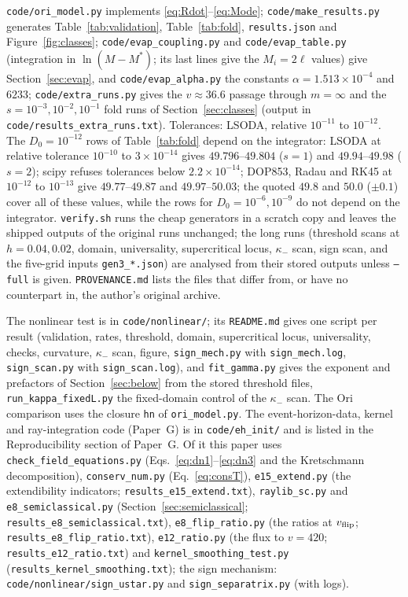 \documentclass[11pt]{article}
\begin{document}
\texttt{code/ori\_model.py} implements \eqref{eq:Rdot}--\eqref{eq:Mode}; \texttt{code/make\_results.py} generates Table~\ref{tab:validation}, Table~\ref{tab:fold}, \texttt{results.json} and Figure~\ref{fig:classes}; \texttt{code/evap\_coupling.py} and \texttt{code/evap\_table.py} (integration in $\ln(M-M^*)$; its last lines give the $M_i=2\ell$ values) give Section~\ref{sec:evap}, and \texttt{code/evap\_alpha.py} the constants $\alpha=1.513\times10^{-4}$ and $6233$; \texttt{code/extra\_runs.py} gives the $v\approx36.6$ passage through $m=\infty$ and the $s=10^{-3},10^{-2},10^{-1}$ fold runs of Section~\ref{sec:classes} (output in \texttt{code/results\_extra\_runs.txt}). Tolerances: LSODA, relative $10^{-11}$ to $10^{-12}$. The $D_0=10^{-12}$ rows of Table~\ref{tab:fold} depend on the integrator: LSODA at relative tolerance $10^{-10}$ to $3\times10^{-14}$ gives $49.796$--$49.804$ ($s=1$) and $49.94$--$49.98$ ($s=2$); scipy refuses tolerances below $2.2\times10^{-14}$; DOP853, Radau and RK45 at $10^{-12}$ to $10^{-13}$ give $49.77$--$49.87$ and $49.97$--$50.03$; the quoted $49.8$ and $50.0$ ($\pm0.1$) cover all of these values, while the rows for $D_0=10^{-6},10^{-9}$ do not depend on the integrator. \texttt{verify.sh} runs the cheap generators in a scratch copy and leaves the shipped outputs of the original runs unchanged; the long runs (threshold scans at $h=0.04,0.02$, domain, universality, supercritical locus, $\kappa_-$ scan, sign scan, and the five-grid inputs \texttt{gen3\_*.json}) are analysed from their stored outputs unless \texttt{--full} is given. \texttt{PROVENANCE.md} lists the files that differ from, or have no counterpart in, the author's original archive.

The nonlinear test is in \texttt{code/nonlinear/}; its \texttt{README.md} gives one script per result (validation, rates, threshold, domain, supercritical locus, universality, checks, curvature, $\kappa_-$ scan, figure, \texttt{sign\_mech.py} with \texttt{sign\_mech.log}, \texttt{sign\_scan.py} with \texttt{sign\_scan.log}), and \texttt{fit\_gamma.py} gives the exponent and prefactors of Section~\ref{sec:below} from the stored threshold files, \texttt{run\_kappa\_fixedL.py} the fixed-domain control of the $\kappa_-$ scan. The Ori comparison uses the closure \texttt{hn} of \texttt{ori\_model.py}. The event-horizon-data, kernel and ray-integration code (Paper~G) is in \texttt{code/eh\_init/} and is listed in the Reproducibility section of Paper~G. Of it this paper uses \texttt{check\_field\_equations.py} (Eqs.~\eqref{eq:dn1}--\eqref{eq:dn3} and the Kretschmann decomposition), \texttt{conserv\_num.py} (Eq.~\eqref{eq:consT}), \texttt{e15\_extend.py} (the extendibility indicators; \texttt{results\_e15\_extend.txt}), \texttt{raylib\_sc.py} and \texttt{e8\_semiclassical.py} (Section~\ref{sec:semiclassical}; \texttt{results\_e8\_semiclassical.txt}), \texttt{e8\_flip\_ratio.py} (the ratios at $v_{\rm flip}$; \texttt{results\_e8\_flip\_ratio.txt}), \texttt{e12\_ratio.py} (the flux to $v=420$; \texttt{results\_e12\_ratio.txt}) and \texttt{kernel\_smoothing\_test.py} (\texttt{results\_kernel\_smoothing.txt}); the sign mechanism: \texttt{code/nonlinear/sign\_ustar.py} and \texttt{sign\_separatrix.py} (with logs).



\end{document}
